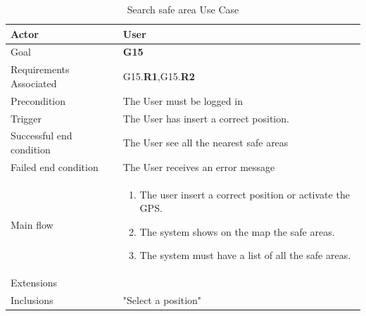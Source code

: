 \newline
\begin{table}[htb]
\begin{center}
\renewcommand{\arraystretch}{1.5}
\begin{tabular}{|l|p{}|}
\hline
Actor & User \\ \hline
Goal & \textbf{G15} \\ \hline
Requirements Associated & G15.\textbf{R1},G15.\textbf{R2} \\ \hline
Precondition & The User must be logged in \\ \hline
Trigger & The User has insert a correct position. \\ \hline
Successful end condition & The User see all the nearest safe areas \\ \hline
Failed end condition & The User receives an error message \\ \hline
Main flow & \begin{minipage}[t]{0.6\textwidth}
\begin{enumerate}
\addtolength{\itemindent}{0.5cm}
\item The user insert a correct position or activate the GPS.
\item The system shows on the map the safe areas.
\item The system must have a list of all the safe areas.
\end{enumerate}
\end{minipage} \\ \hline
Extensions & \\ \hline
Inclusions & "Select a position" \\ \hline
\end{tabular}
\caption{Search safe area Use Case}
\end{center}
\end{table}
\clearpage

